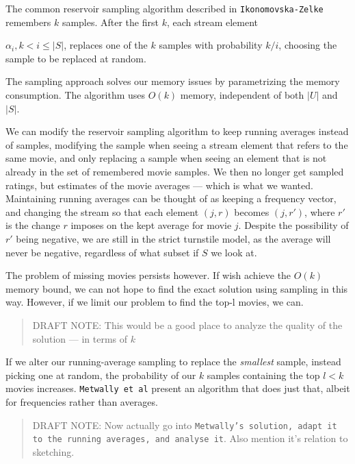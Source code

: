 The common reservoir sampling algorithm described in
\texttt{Ikonomovska\--Zelke} remembers $k$ samples. After the first $k$, each
stream element \raggedright{$\alpha_i, k < i \leq |S|$}, replaces one of the
$k$ samples with probability $k/i$, choosing the sample to be replaced at
random.

The sampling approach solves our memory issues by parametrizing the memory
consumption. The algorithm uses $O(k)$ memory, independent of both $|U|$ and
$|S|$.

We can modify the reservoir sampling algorithm to keep running averages instead
of samples, modifying the sample when seeing a stream element that refers to the
same movie, and only replacing a sample when seeing an element that is not
already in the set of remembered movie samples. We then no longer get sampled
ratings, but estimates of the movie averages --- which is what we wanted.
Maintaining running averages can be thought of as keeping a frequency vector,
and changing the stream so that each element $(j, r)$ becomes $(j, r')$, where
$r'$ is the change $r$ imposes on the kept average for movie $j$. Despite
the possibility of $r'$ being negative, we are still in the strict turnstile
model, as the average will never be negative, regardless of what subset if $S$
we look at.

The problem of missing movies persists however. If wish achieve the $O(k)$
memory bound, we can not hope to find the exact solution using sampling in this
way. However, if we limit our problem to find the top-l movies, we can.

\begin{quote}
	DRAFT NOTE: This would be a good place to analyze the quality of the
	solution --- in terms of $k$
\end{quote}

If we alter our running-average sampling to replace the \textit{smallest}
sample, instead picking one at random, the probability of our $k$ samples
containing the top $l<k$ movies increases. \texttt{Metwally et al} present an
algorithm that does just that, albeit for frequencies rather than averages.

\begin{quote}
	DRAFT NOTE: Now actually go into \texttt{Metwally's solution, adapt it
	to the running averages, and analyse it}.
	Also mention it's relation to sketching.
\end{quote}

